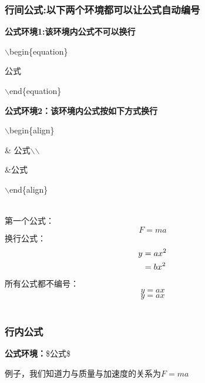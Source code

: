 \documentclass[UTF8]{ctexart}
\begin{document}
    \subsubsection{行间公式:以下两个环境都可以让公式自动编号}

    \textbf{公式环境1:该环境内公式不可以换行}
    
    $\backslash$begin\{equation\}
    
    公式
    
    $\backslash$end\{equation\}
    
    \textbf{公式环境2：该环境内公式按如下方式换行}
    
    $\backslash$begin\{align\}
    
    \& 公式$\backslash$$\backslash$
    
    \&公式
    
    $\backslash$end\{align\}
    
    ~\\ %
    第一个公式：
    \begin{equation}
    	F=ma
    \end{equation}
    换行公式：
    \begin{align}
    	y&=ax^2 \notag \\ %
    	 &=bx^2  %
    \end{align}
    所有公式都不编号：
    \begin{equation*} %
    	y=ax
    \end{equation*}
    \[
        y=ax
    \]
    ~\\
    \subsubsection{行内公式}
    \textbf{公式环境：}\$公式\$
    
    例子，我们知道力与质量与加速度的关系为$F=ma$
\end{document}
